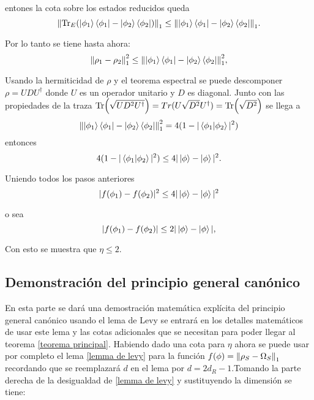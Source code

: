 entones la cota sobre los estados reducidos queda 
\begin{equation}
\norm{\Tr_{E}(\ket{\phi_{1}} \bra{\phi_{1}}-\ket{\phi_{2}} \bra{\phi_{2}})}_{1} \le \norm{\ket{\phi_{1}} \bra{\phi_{1}}-\ket{\phi_{2}} \bra{\phi_{2}}}_{1}.
\end{equation}

Por lo tanto se tiene hasta ahora:
\begin{equation}
\norm{\rho_{1}- \rho_{2} }_{1}^2 \le \norm{\ket{\phi_{1}} \bra{\phi_{1}}-\ket{\phi_{2}} \bra{\phi_{2}}}_{1}^{2},
\end{equation}

Usando la hermiticidad de $\rho$ y el teorema espectral se puede descomponer $\rho= UDU^{\dag}$ donde $U$ es un operador unitario y $D$ es diagonal. Junto con las propiedades de la traza $\Tr(\sqrt{UD^2U^{\dag}})= Tr(U\sqrt{D^2}U^{\dag})= \Tr(\sqrt{D^{2}})$ se llega a
\begin{equation}
\norm{\ket{\phi_{1}} \bra{\phi_{1}}-\ket{\phi_{2}} \bra{\phi_{2}}}_{1}^{2} = 4(1-|\bra{\phi_{1}} \ket{\phi_{2}}|^{2})
\end{equation}
entonces
\begin{equation}
 4(1-|\bra{\phi_{1}} \ket{\phi_{2}}|^{2}) \le 4|\ket{\phi}-\ket{\phi}|^2.
\end{equation}

Uniendo todos los pasos anteriores
\begin{equation}
|f(\phi_{1})-f(\phi_{2})|^{2} \le  4|\ket{\phi}-\ket{\phi}|^2
\end{equation}

o sea 
\begin{equation}
|f(\phi_{1})-f(\phi_{2})| \le  2|\ket{\phi}-\ket{\phi}|,
\end{equation}

Con esto se muestra que $\eta \le 2$.\\

\subsection{Demonstración del principio general canónico}
En esta parte se dará una demostración matemática explícita del principio general canónico usando el lema de Levy se entrará en los detalles matemáticos de usar este lema y las cotas adicionales que se necesitan para poder llegar al teorema \ref{teorema principal}. Habiendo dado una cota para $\eta$ ahora se puede usar por completo el lema \ref{lemma de levy} para la función $f(\phi)=\norm{\rho_{S} -\Omega_{S}}_{1}$ recordando que se reemplazará $d$ en el lema por $d=2d_{R}-1$.Tomando la parte derecha de la desigualdad de \ref{lemma de levy}  y sustituyendo la dimensión se tiene:


